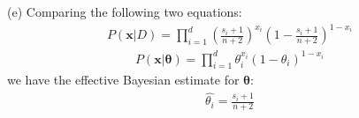 \documentclass[12pt]{article}
\begin{document}
\noindent(e) Comparing the following two equations:
\begin{equation*}
\begin{aligned}
P(\bm{x}|D) = \prod_{i=1}^d  (\frac{s_i+1}{n+2})^{x_i} (1-\frac{s_i+1}{n+2})^{1-x_i}
\end{aligned}
\end{equation*}
\begin{equation*}
\begin{aligned}
P(\bm{x}|\bm{\theta}) = \prod_{i=1}^d\theta_i^{x_i}(1-\theta_i)^{1-x_i}
\end{aligned}
\end{equation*}
we have the effective Bayesian estimate for $\bm{\theta}$:
\begin{equation*}
\begin{aligned}
\hat{\theta_i} = \frac{s_i+1}{n+2}
\end{aligned}
\end{equation*}
\end{document}
